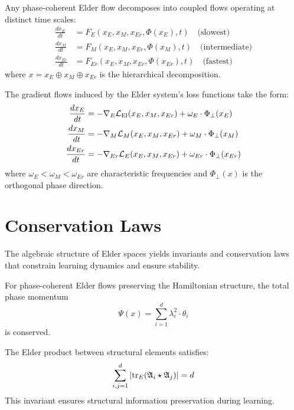 \begin{theorem}
\label{thm:elder-flow-decomposition}
Any phase-coherent Elder flow decomposes into coupled flows operating at distinct time scales:
\begin{align}
\frac{dx_E}{dt} &= F_E(x_E, x_M, x_{Er}, \Phi(x_E), t) \quad \text{(slowest)}\\
\frac{dx_M}{dt} &= F_M(x_E, x_M, x_{Er}, \Phi(x_M), t) \quad \text{(intermediate)}\\
\frac{dx_{Er}}{dt} &= F_{Er}(x_E, x_M, x_{Er}, \Phi(x_{Er}), t) \quad \text{(fastest)}
\end{align}
where $x = x_E \oplus x_M \oplus x_{Er}$ is the hierarchical decomposition.
\end{theorem}

The gradient flows induced by the Elder system's loss functions take the form:
\begin{align}
\frac{dx_E}{dt} &= -\nabla_E \mathcal{L}_{\text{El}}(x_E, x_M, x_{Er}) + \omega_E \cdot \Phi_{\perp}(x_E)\\
\frac{dx_M}{dt} &= -\nabla_M \mathcal{L}_M(x_E, x_M, x_{Er}) + \omega_M \cdot \Phi_{\perp}(x_M)\\
\frac{dx_{Er}}{dt} &= -\nabla_{Er} \mathcal{L}_E(x_E, x_M, x_{Er}) + \omega_{Er} \cdot \Phi_{\perp}(x_{Er})
\end{align}
where $\omega_E < \omega_M < \omega_{Er}$ are characteristic frequencies and $\Phi_{\perp}(x)$ is the orthogonal phase direction.

\section{Conservation Laws}

The algebraic structure of Elder spaces yields invariants and conservation laws that constrain learning dynamics and ensure stability.

\begin{theorem}
For phase-coherent Elder flows preserving the Hamiltonian structure, the total phase momentum
\begin{equation}
\Psi(x) = \sum_{i=1}^{d} \lambda_i^2 \cdot \theta_i
\end{equation}
is conserved.
\end{theorem}

\begin{theorem}
The Elder product between structural elements satisfies:
\begin{equation}
\sum_{i,j=1}^{d} |\mathrm{tr}_E(\mathfrak{A}_{i} \star \mathfrak{A}_{j})| = d
\end{equation}
This invariant ensures structural information preservation during learning.
\end{theorem}

